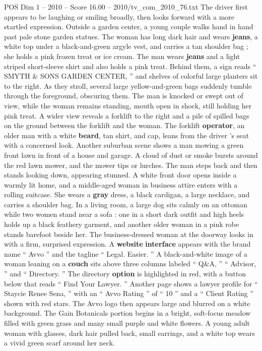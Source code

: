 \begin{textsample}{POS Dim 1 – 2010 – Score 16.00 – 2010/tv\_com\_2010\_76.txt}
The driver first appears to be laughing or smiling broadly, then looks forward with a more startled expression.
Outside a garden center, a young couple walks hand in hand past pale stone garden statues.
The woman has long dark hair and wears \textbf{jeans}, a white top under a black-and-green argyle vest, and carries a tan shoulder bag ; she holds a pink frozen treat or ice cream.
The man wears \textbf{jeans} and a light striped short-sleeve shirt and also holds a pink treat.
Behind them, a sign reads “ SMYTH \& SONS GARDEN CENTER, ” and shelves of colorful large planters sit to the right.
As they stroll, several large yellow-and-green bags suddenly tumble through the foreground, obscuring them.
The man is knocked or swept out of view, while the woman remains standing, mouth open in shock, still holding her pink treat.
A wider view reveals a forklift to the right and a pile of spilled bags on the ground between the forklift and the woman.
The forklift \textbf{operator}, an older man with a white \textbf{beard}, tan shirt, and cap, leans from the driver ’s seat with a concerned look.
Another suburban scene shows a man mowing a green front lawn in front of a house and garage.
A cloud of dust or smoke bursts around the red lawn mower, and the mower tips or lurches.
The man steps back and then stands looking down, appearing stunned.
A white front door opens inside a warmly lit home, and a middle-aged woman in business attire enters with a rolling suitcase.
She wears a \textbf{gray} dress, a black cardigan, a large necklace, and carries a shoulder bag.
In a living room, a large dog sits calmly on an ottoman while two women stand near a sofa : one in a short dark outfit and high heels holds up a black feathery garment, and another older woman in a pink robe stands barefoot beside her.
The business-dressed woman at the doorway looks in with a firm, surprised expression.
A \textbf{website} \textbf{interface} appears with the brand name “ Avvo ” and the tagline “ Legal.
Easier. ” A black-and-white image of a woman leaning on a \textbf{couch} sits above three columns labeled “ Q\&A, ” “ Advisor, ” and “ Directory. ” The directory \textbf{option} is highlighted in red, with a button below that reads “ Find Your Lawyer. ” Another page shows a lawyer profile for “ Staycie Renee Sena, ” with an “ Avvo Rating ” of “ 10 ” and a “ Client Rating ” shown with red stars.
The Avvo logo then appears large and blurred on a white background.
The Gain Botanicals portion begins in a bright, soft-focus meadow filled with green grass and many small purple and white flowers.
A young adult woman with glasses, dark hair pulled back, small earrings, and a white top wears a vivid green scarf around her neck.

\end{textsample}

